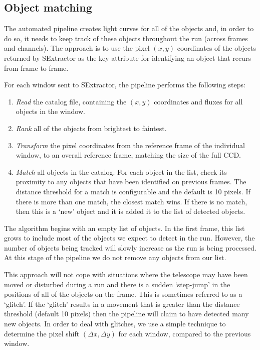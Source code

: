 \subsection{Object matching}
The automated pipeline creates light curves for all of the objects and, in order to do so, it needs to keep track of these objects throughout the run (across frames and channels). The approach is to use the pixel $(x, y)$ coordinates of the objects returned by SExtractor as the key attribute for identifying an object that recurs from frame to frame. 

For each window sent to SExtractor, the pipeline performs the following steps:
\begin{enumerate}
  \item \emph{Read} the catalog file, containing the $(x, y)$ coordinates and fluxes for all objects in the window.
  \item \emph{Rank} all of the objects from brightest to faintest.
  \item \emph{Transform} the pixel coordinates from the reference frame of the individual window, to an overall reference frame, matching the size of the full CCD. 
  \item \emph{Match} all objects in the catalog. For each object in the list, check its proximity to any objects that have been identified on previous frames. The distance threshold for a match is configurable and the default is 10 pixels. If there is more than one match, the closest match wins. If there is no match, then this is a `new' object and it is added it to the list of detected objects.  
\end{enumerate}

The algorithm begins with an empty list of objects. In the first frame, this list grows to include most of the objects we expect to detect in the run. However, the number of objects being tracked will slowly increase as the run is being processed. At this stage of the pipeline we do not remove any objects from our list. 

This approach will not cope with situations where the telescope may have been moved or disturbed during a run and there is a sudden `step-jump' in the positions of all of the objects on the frame. This is sometimes referred to as a `glitch'. If the `glitch' results in a movement that is greater than the distance threshold (default 10 pixels) then the pipeline will claim to have detected many new objects. In order to deal with glitches, we use a simple technique to determine the pixel shift $(\Delta x, \Delta y)$ for each window, compared to the previous window. 

